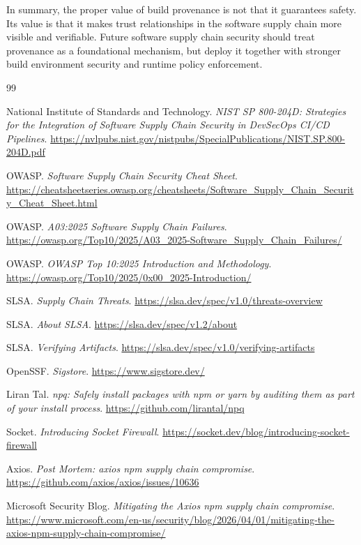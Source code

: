 \documentclass[12pt,a4paper]{article}
\begin{document}
In summary, the proper value of build provenance is not that it guarantees safety. Its value is that it makes trust relationships in the software supply chain more visible and verifiable. Future software supply chain security should treat provenance as a foundational mechanism, but deploy it together with stronger build environment security and runtime policy enforcement.

\newpage
\begin{thebibliography}{99}

National Institute of Standards and Technology.
\textit{NIST SP 800-204D: Strategies for the Integration of Software Supply Chain Security in DevSecOps CI/CD Pipelines}.
\url{https://nvlpubs.nist.gov/nistpubs/SpecialPublications/NIST.SP.800-204D.pdf}

OWASP.
\textit{Software Supply Chain Security Cheat Sheet}.
\url{https://cheatsheetseries.owasp.org/cheatsheets/Software_Supply_Chain_Security_Cheat_Sheet.html}

OWASP.
\textit{A03:2025 Software Supply Chain Failures}.
\url{https://owasp.org/Top10/2025/A03_2025-Software_Supply_Chain_Failures/}

OWASP.
\textit{OWASP Top 10:2025 Introduction and Methodology}.
\url{https://owasp.org/Top10/2025/0x00_2025-Introduction/}

SLSA.
\textit{Supply Chain Threats}.
\url{https://slsa.dev/spec/v1.0/threats-overview}

SLSA.
\textit{About SLSA}.
\url{https://slsa.dev/spec/v1.2/about}

SLSA.
\textit{Verifying Artifacts}.
\url{https://slsa.dev/spec/v1.0/verifying-artifacts}

OpenSSF.
\textit{Sigstore}.
\url{https://www.sigstore.dev/}

Liran Tal.
\textit{npq: Safely install packages with npm or yarn by auditing them as part of your install process}.
\url{https://github.com/lirantal/npq}

Socket.
\textit{Introducing Socket Firewall}.
\url{https://socket.dev/blog/introducing-socket-firewall}

Axios.
\textit{Post Mortem: axios npm supply chain compromise}.
\url{https://github.com/axios/axios/issues/10636}

Microsoft Security Blog.
\textit{Mitigating the Axios npm supply chain compromise}.
\url{https://www.microsoft.com/en-us/security/blog/2026/04/01/mitigating-the-axios-npm-supply-chain-compromise/}


\end{thebibliography}
\end{document}
